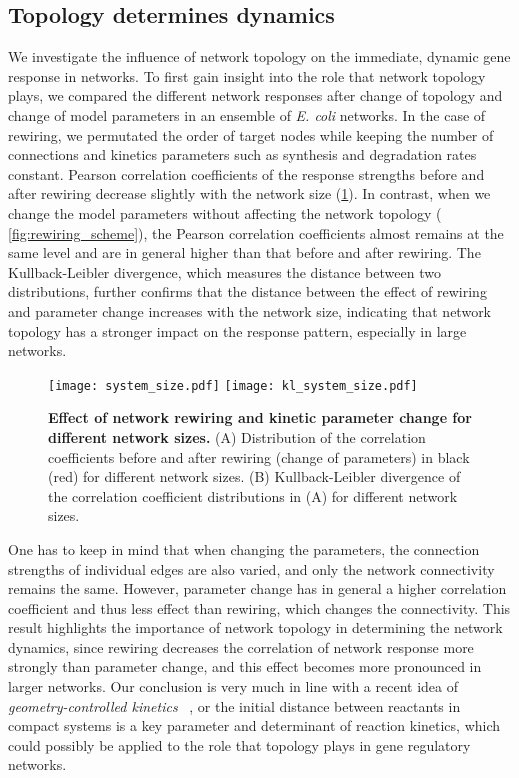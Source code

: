 \subsection{Topology determines dynamics}
We investigate the influence of network topology on the immediate, dynamic gene response in networks. 
To first gain insight into the role that network topology plays, we compared
the different network responses after change of topology and change of model
parameters in an ensemble of \emph{E. coli} networks.
In the case of rewiring, we permutated the order of target nodes while keeping
the number of connections and kinetics parameters such as synthesis and 
degradation rates constant. Pearson correlation coefficients of the response
strengths before and after rewiring decrease slightly with the network size 
(\ref{fig:system_size}). 
In contrast, when we 
change the model parameters without affecting the network topology (%
\ref{fig:rewiring_scheme}), the Pearson correlation coefficients almost remains 
at the same level and 
are in general higher than that before and after rewiring. The Kullback-Leibler
divergence, which measures the distance between two distributions, further 
confirms that the distance between the effect of rewiring and parameter change 
increases with the network size, indicating that network topology has a stronger 
impact on the response pattern, especially in large networks. 

\begin{figure}[!ht]
\begin{center}
\texttt{[image: system\_size.pdf]}
\texttt{[image: kl\_system\_size.pdf]}
\end{center}
\caption[Effect of rewiring and parameter change]{
{\bf Effect of network rewiring and kinetic parameter change for different network
sizes.} 
(A) Distribution of the correlation coefficients
before and after rewiring (change of parameters) in black (red) for 
different network sizes. (B) Kullback-Leibler divergence of the 
correlation coefficient distributions in (A) for different network
sizes.
}
\label{fig:system_size}
\end{figure}

One has to keep in mind that when changing the parameters,
the connection strengths of individual edges are also varied,
and only the network connectivity remains the same. However,
parameter change has in general a higher correlation coefficient
and thus less effect than rewiring, which changes the connectivity.
This result highlights the importance of network topology in
determining the network dynamics, since rewiring decreases
the correlation of network response more strongly than 
parameter change, and this effect becomes more pronounced in
larger networks. Our conclusion is very much in line with a 
recent idea of \emph{geometry-controlled kinetics}~%
\citep{Benichou2010}, or the 
initial distance between reactants in compact systems is 
a key parameter and determinant of reaction kinetics, which 
could possibly be applied to the role that topology plays 
in gene regulatory networks.

